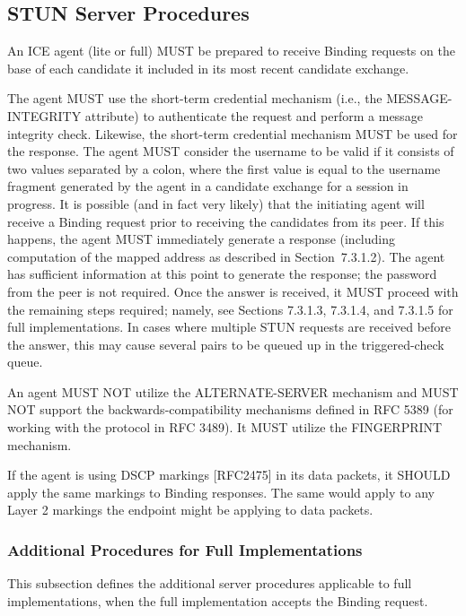 \documentclass{article}
\begin{document}
\subsection{STUN Server Procedures}

An ICE agent (lite or full) MUST be prepared to receive Binding requests on the base of each candidate it included in its most recent candidate exchange.

The agent MUST use the short-term credential mechanism (i.e., the MESSAGE-INTEGRITY attribute) to authenticate the request and perform a message integrity check.  Likewise, the short-term credential mechanism MUST be used for the response.  The agent MUST consider the username to be valid if it consists of two values separated by a colon, where the first value is equal to the username fragment generated by the agent in a candidate exchange for a session in progress.  It is possible (and in fact very likely) that the initiating agent will receive a Binding request prior to receiving the candidates from its peer.  If this happens, the agent MUST immediately generate a response (including computation of the mapped address as described in Section~7.3.1.2).  The agent has sufficient information at this point to generate the response; the password from the peer is not required.  Once the answer is received, it MUST proceed with the remaining steps required; namely, see Sections 7.3.1.3, 7.3.1.4, and 7.3.1.5 for full implementations.  In cases where multiple STUN requests are received before the answer, this may cause several pairs to be queued up in the triggered-check queue.

An agent MUST NOT utilize the ALTERNATE-SERVER mechanism and MUST NOT support the backwards-compatibility mechanisms defined in RFC 5389 (for working with the protocol in RFC 3489).  It MUST utilize the FINGERPRINT mechanism.

If the agent is using DSCP markings [RFC2475] in its data packets, it SHOULD apply the same markings to Binding responses.  The same would apply to any Layer 2 markings the endpoint might be applying to data packets.

\subsubsection{Additional Procedures for Full Implementations}

This subsection defines the additional server procedures applicable to full implementations, when the full implementation accepts the Binding request.
\end{document}
